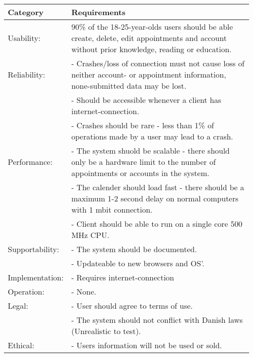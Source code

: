 {\tabulinesep=1.2mm
\begin{tabu}{ | p{3cm} | p{13cm} |}
    \hline
    Category	 			& 		Requirements \\\hline
    Usability:	  			& 		90\% of the 18-25-year-olds users should be able create, delete, edit appointments and account without prior knowledge, reading or education. \\\hline
    Reliability: 			& 		- Crashes/loss of connection must not cause loss of neither account- or appointment information, none-submitted data may be lost. \\
							&		- Should be accessible whenever a client has internet-connection.\\
							&		- Crashes should be rare - less than 1\% of operations made by a user may lead to a crash. \\ \hline
	Performance:			&		- The system shuold be scalable - there should only be a hardware limit to the number of appointments or accounts in the system.\\
							&		- The calender should load fast - there should be a maximum 1-2 second delay on normal computers with 1 mbit connection.\\
							&		- Client should be able to run on a single core 500 MHz CPU.\\ \hline
    Supportability: 		& 		- The system should be documented.  \\
    						&		- Updateable to new browsers and OS'. \\ \hline
	Implementation: 		&		- Requires internet-connection\\\hline
	Operation:				&	 	- None. \\\hline
	Legal:					&		- User should agree to terms of use.\\
							&		- The system should not conflict with Danish laws (Unrealistic to test).\\\hline
	Ethical:				&		- Users information will not be used or sold.\\\hline
\end{tabu}
}